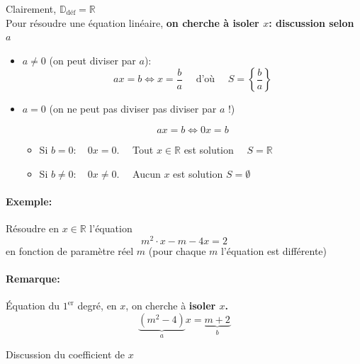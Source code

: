 \documentclass[
    11pt,
    a4paper,
    oneside,
    headinlcude, footinclude,
    twoside,
]{report}
\begin{document}
Clairement, $\mathbb{D}_{\text{déf}} = \mathbb{R}$\\
Pour résoudre une équation linéaire, \textbf{on cherche à isoler $x$:
discussion selon $a$} 

\begin{itemize}
    \item $a \neq 0$ (on peut diviser par $a$):
        $$ax=b \iff x = \frac{b}{a} \quad \text{ d'où } \quad S = \left\{\frac{b}{a}\right\}$$
    \item $a = 0$ (on ne peut pas diviser pas diviser par $a$ !)

        $$ax=b \iff 0x=b$$
        
        \begin{itemize}
            \item Si $b = 0: \quad 0x = 0.\quad$ Tout $x \in \mathbb{R}$ est
                solution $\quad S = \mathbb{R}$
            \item Si $b \neq 0: \quad 0x \neq 0. \quad$ Aucun $x$ est solution
                $S = \emptyset$
        \end{itemize}
\end{itemize}

\paragraph{Exemple:}

Résoudre en $x \in \mathbb{R}$ l'équation $$m^{2} \cdot x - m - 4x = 2$$ en
fonction de paramètre réel $m$ (pour chaque $m$ l'équation est différente)

\paragraph{Remarque:}

Équation du $1^{\text{er}}$ degré, en $x$, on cherche à \textbf{isoler $x$.} 
$$\underbrace{(m^{2} - 4)}_a x = \underbrace{m + 2}_b$$

Discussion du coefficient de $x$
\end{document}
